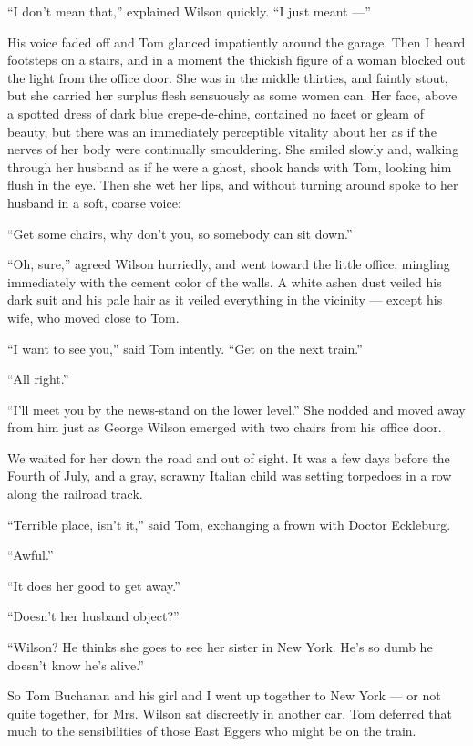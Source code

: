 \documentclass{znotebook}
\begin{document}
``I don't mean that,'' explained Wilson quickly. ``I just meant ---''

His voice faded off and Tom glanced impatiently around the garage. Then I heard footsteps on a stairs, and in a moment the thickish figure of a woman blocked out the light from the office door. She was in the middle thirties, and faintly stout, but she carried her surplus flesh sensuously as some women can. Her face, above a spotted dress of dark blue crepe-de-chine, contained no facet or gleam of beauty, but there was an immediately perceptible vitality about her as if the nerves of her body were continually smouldering. She smiled slowly and, walking through her husband as if he were a ghost, shook hands with Tom, looking him flush in the eye. Then she wet her lips, and without turning around spoke to her husband in a soft, coarse voice:

``Get some chairs, why don't you, so somebody can sit down.''

``Oh, sure,'' agreed Wilson hurriedly, and went toward the little office, mingling immediately with the cement color of the walls. A white ashen dust veiled his dark suit and his pale hair as it veiled everything in the vicinity ---{} except his wife, who moved close to Tom.

``I want to see you,'' said Tom intently. ``Get on the next train.''

``All right.''

``I'll meet you by the news-stand on the lower level.'' She nodded and moved away from him just as George Wilson emerged with two chairs from his office door.

We waited for her down the road and out of sight. It was a few days before the Fourth of July, and a gray, scrawny Italian child was setting torpedoes in a row along the railroad track.

``Terrible place, isn't it,'' said Tom, exchanging a frown with Doctor Eckleburg.

``Awful.''

``It does her good to get away.''

``Doesn't her husband object?''

``Wilson? He thinks she goes to see her sister in New York. He's so dumb he doesn't know he's alive.''

So Tom Buchanan and his girl and I went up together to New York ---{} or not quite together, for Mrs. Wilson sat discreetly in another car. Tom deferred that much to the sensibilities of those East Eggers who might be on the train.
\end{document}
